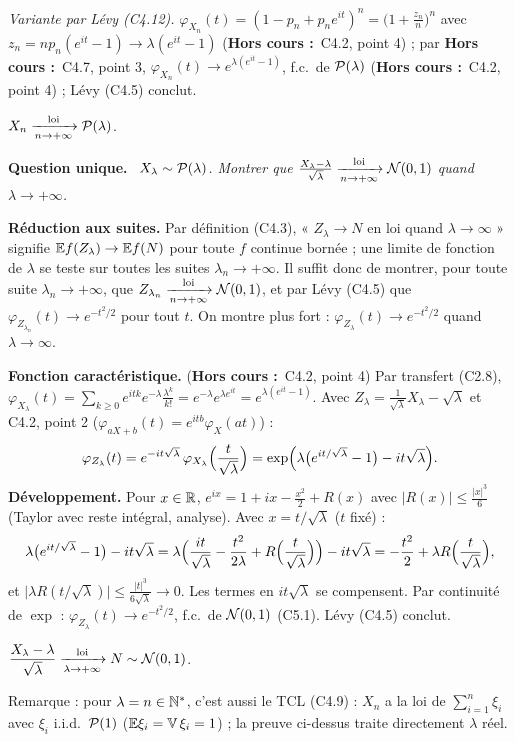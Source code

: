 \documentclass[11pt,a4paper]{article}
\newcommand{\question}[1]{\par\medskip\noindent\textbf{Question #1.}~}
\newcommand{\hc}{\textbf{Hors cours :}~}
\begin{document}
\begin{exo}
\emph{Variante par Lévy (C4.12).} $\varphi_{X_n}(t)=(1-p_n+p_ne^{it})^n=\bigl(1+\frac{z_n}n\bigr)^n$ avec $z_n=np_n(e^{it}-1)\to\lambda(e^{it}-1)$
(\hc C4.2, point 4) ; par \hc C4.7, point 3, $\varphi_{X_n}(t)\to e^{\lambda(e^{it}-1)}$, f.c.\ de $\mathcal{P}(\lambda)$ (\hc C4.2, point 4) ; Lévy (C4.5) conclut.
\begin{resultat}
$X_n\xrightarrow[n\to+\infty]{\text{loi}}\mathcal{P}(\lambda)$.
\end{resultat}
\end{exo}

\begin{exo}

\question{unique} \emph{$X_\lambda\sim\mathcal{P}(\lambda)$. Montrer que $\frac{X_\lambda-\lambda}{\sqrt\lambda}\xrightarrow[n\to+\infty]{\text{loi}}\mathcal{N}(0,1)$ quand $\lambda\to+\infty$.}

\textbf{Réduction aux suites.} Par définition (C4.3), « $Z_\lambda\to N$ en loi quand $\lambda\to\infty$ » signifie
$\mathbb{E} f(Z_\lambda)\to\mathbb{E} f(N)$ pour toute $f$ continue bornée ; une limite de fonction de $\lambda$ se teste sur toutes les suites
$\lambda_n\to+\infty$. Il suffit donc de montrer, pour toute suite $\lambda_n\to+\infty$, que $Z_{\lambda_n}\xrightarrow[n\to+\infty]{\text{loi}}\mathcal{N}(0,1)$, et par Lévy
(C4.5) que $\varphi_{Z_{\lambda_n}}(t)\to e^{-t^2/2}$ pour tout $t$. On montre plus fort : $\varphi_{Z_\lambda}(t)\to e^{-t^2/2}$ quand $\lambda\to\infty$.

\textbf{Fonction caractéristique.} (\hc C4.2, point 4) Par transfert (C2.8),
$\varphi_{X_\lambda}(t)=\sum_{k\ge0}e^{itk}e^{-\lambda}\frac{\lambda^k}{k!}=e^{-\lambda}e^{\lambda e^{it}}=e^{\lambda(e^{it}-1)}$.
Avec $Z_\lambda=\frac1{\sqrt\lambda}X_\lambda-\sqrt\lambda$ et C4.2, point 2 ($\varphi_{aX+b}(t)=e^{itb}\varphi_X(at)$) :
\[\varphi_{Z_\lambda}(t)=e^{-it\sqrt\lambda}\,\varphi_{X_\lambda}\Bigl(\frac t{\sqrt\lambda}\Bigr)=\exp\Bigl(\lambda\bigl(e^{it/\sqrt\lambda}-1\bigr)-it\sqrt\lambda\Bigr).\]
\textbf{Développement.} Pour $x\in\mathbb{R}$, $e^{ix}=1+ix-\frac{x^2}2+R(x)$ avec $|R(x)|\le\frac{|x|^3}6$ (Taylor avec reste intégral, analyse).
Avec $x=t/\sqrt\lambda$ ($t$ fixé) :
\[\lambda\bigl(e^{it/\sqrt\lambda}-1\bigr)-it\sqrt\lambda=\lambda\Bigl(\frac{it}{\sqrt\lambda}-\frac{t^2}{2\lambda}+R\Bigl(\frac t{\sqrt\lambda}\Bigr)\Bigr)-it\sqrt\lambda
=-\frac{t^2}2+\lambda R\Bigl(\frac t{\sqrt\lambda}\Bigr),\]
et $\bigl|\lambda R(t/\sqrt\lambda)\bigr|\le\frac{|t|^3}{6\sqrt\lambda}\to0$. Les termes en $it\sqrt\lambda$ se compensent. Par continuité de $\exp$ :
$\varphi_{Z_\lambda}(t)\to e^{-t^2/2}$, f.c.\ de $\mathcal{N}(0,1)$ (C5.1). Lévy (C4.5) conclut.
\begin{resultat}
$\dfrac{X_\lambda-\lambda}{\sqrt\lambda}\xrightarrow[\lambda\to+\infty]{\text{loi}}N\sim\mathcal{N}(0,1)$.
\end{resultat}
Remarque : pour $\lambda=n\in\mathbb{N}^*$, c'est aussi le TCL (C4.9) : $X_n$ a la loi de $\sum_{i=1}^n\xi_i$ avec $\xi_i$ i.i.d.\ $\mathcal{P}(1)$ ($\mathbb{E}\xi_i=\operatorname{\mathbb{V}}\xi_i=1$) ;
la preuve ci-dessus traite directement $\lambda$ réel.
\end{exo}
\end{document}

